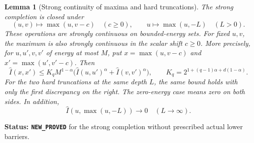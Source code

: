 \documentclass[11pt,a4paper]{article}
\numberwithin{equation}{section}
\newtheorem{lemma}[theorem]{Lemma}
\theoremstyle{definition}
\theoremstyle{remark}
\begin{document}
\begin{lemma}[Strong continuity of maxima and hard truncations]
\label{lem:r11-strong-max-clipping}
The strong completion is closed under
\[
                 (u,v)\longmapsto\max(u,v-c)\quad(c\geq0),
                 \qquad u\longmapsto\max(u,-L)\quad(L>0).
 \tag{CC1}
\]
These operations are strongly continuous on bounded-energy sets.
For fixed $u,v$, the maximum is also strongly continuous in
the scalar shift $c\geq0$.
More precisely, for $u,u',v,v'$ of energy at most $M$, put
$x=\max(u,v-c)$ and $x'=\max(u',v'-c)$. Then
\[
 \widehat I(x,x')
  \leq K_q M^{1-\alpha}
       \bigl(\widehat I(u,u')^\alpha+
                         \widehat I(v,v')^\alpha\bigr),
 \qquad K_q=2^{1+(q-1)\alpha+d(1-\alpha)}.
 \tag{CC2}
\]
For the two hard truncations at the same depth $L$, the same
bound holds with only the first discrepancy on the right.
The zero-energy case means zero on both sides. In addition,
\[
                  \widehat I(u,\max(u,-L))\longrightarrow0
                                   \quad(L\to\infty).
 \tag{CC3}
\]
\end{lemma}

\noindent\textbf{Status: \texttt{NEW\_PROVED}} for the strong
completion without prescribed actual lower barriers.
\end{document}
